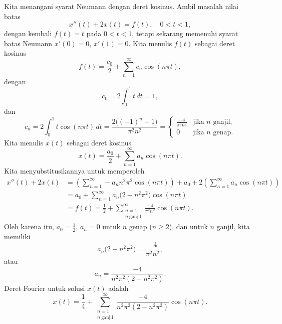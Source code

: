 \begin{example}
Kita menangani syarat Neumann dengan deret kosinus.
Ambil masalah nilai batas
\begin{equation*}
x''(t) + 2 x(t) = f(t) , \quad 0 < t < 1,
\end{equation*}
dengan kembali $f(t) = t$ pada $0 < t < 1$, tetapi sekarang memenuhi
syarat batas Neumann
$x'(0) = 0$, $x'(1)=0$.
Kita menulis $f(t)$ sebagai deret kosinus
\begin{equation*}
f(t) = \frac{c_0}{2} + \sum_{n=1}^\infty c_n \cos (n \pi t) ,
\end{equation*}
dengan
\begin{equation*}
c_0 = 2 \int_0^1 t \,dt = 1 ,
\end{equation*}
dan
\begin{equation*}
c_n = 2 \int_0^1 t \cos (n \pi t) \,dt =
\frac{2\bigl({(-1)}^n-1\bigr)}{\pi^2 n^2} = 
\begin{cases}
\frac{-4}{\pi^2 n^2} & \text{jika } n \text{ ganjil} , \\
0 & \text{jika } n \text{ genap}.
\end{cases}
\end{equation*}
Kita menulis $x(t)$ sebagai deret kosinus
\begin{equation*}
x(t) = \frac{a_0}{2} + \sum_{n=1}^\infty a_n \cos (n \pi t) .
\end{equation*}
Kita menyubstitusikannya untuk memperoleh 
\begin{equation*}
\begin{split}
x''(t) + 2 x(t) & =
\left(
\sum_{n=1}^\infty - a_n n^2 \pi^2 \cos (n \pi t)
\right)
+
a_0 +
2
\left(
\sum_{n=1}^\infty a_n \cos (n \pi t)
\right)
\\
& =
a_0 +
\sum_{n=1}^\infty a_n \bigl(2 - n^2 \pi^2 \bigr) \cos (n \pi t)
\\
& = f(t)
=
\frac{1}{2} +
\sum_{\substack{n=1\\n~\text{ganjil}}}^\infty
\frac{-4}{\pi^2 n^2} \cos (n \pi t) .
\end{split}
\end{equation*}
Oleh karena itu,
$a_0 = \frac{1}{2}$,
$a_n = 0$ untuk $n$ genap ($n \geq 2$), dan untuk
$n$ ganjil, kita memiliki
\begin{equation*}
a_n \bigl(2 - n^2 \pi^2\bigr)
=
\frac{-4}{\pi^2 n^2} ,
\end{equation*}
atau
\begin{equation*}
a_n
=
\frac{-4}{n^2 \pi^2 (2 - n^2 \pi^2)} .
\end{equation*}
Deret Fourier untuk solusi $x(t)$ adalah
\begin{equation*}
x(t) = 
\frac{1}{4} +
\sum_{\substack{n=1\\n~\text{ganjil}}}^\infty
\frac{-4}{n^2 \pi^2 (2 - n^2 \pi^2)} 
\cos (n \pi t) .
\end{equation*}
\end{example}

